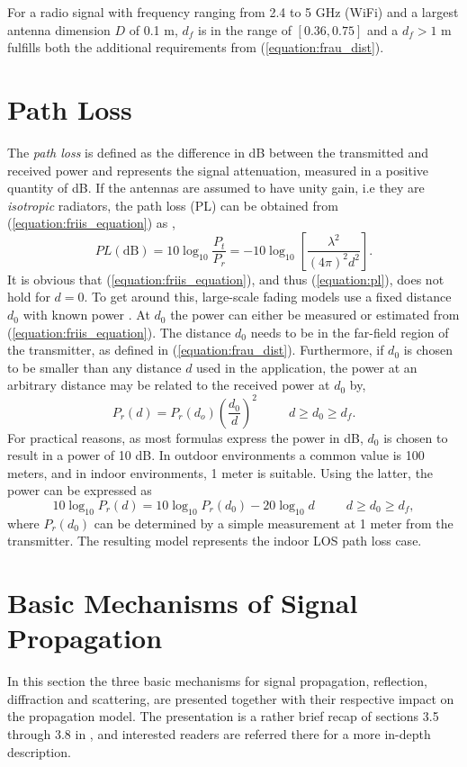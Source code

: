 \documentclass{LTHthesis}
\begin{document}
For a radio signal with frequency ranging from 2.4 to 5 GHz (WiFi) and a largest antenna dimension $D$ of 0.1 m, $d_f$ is in the
range of $\left[0.36,0.75\right]$  and a $d_f>1$ m fulfills both the additional requirements from (\ref{equation:frau_dist}).
%
\section{Path Loss}
%
The \emph{path loss} is defined as the difference in dB between the transmitted and received power and represents the signal attenuation, measured in a positive quantity of dB. If the antennas are assumed to have unity gain, i.e they are \emph{isotropic} radiators, the path loss (PL) can be obtained from (\ref{equation:friis_equation}) as \cite{rappaport96}, 
%
\begin{equation}
PL\left(\text{dB}\right)=10\log_{10}{\frac{P_t}{P_r}}=-10\log_{10}{\left[\frac{\lambda^2}{\left(4\pi\right)^2d^2}\right]}\label{equation:pl}.
\end{equation} 
%
It is obvious that (\ref{equation:friis_equation}), and thus (\ref{equation:pl}), does not hold for $d=0$. To get around this, large-scale fading models use a fixed distance $d_0$ with known power \cite{rappaport96}. At $d_0$ the power can either be measured or estimated from (\ref{equation:friis_equation}). The distance $d_0$ needs to be in the far-field region of the transmitter, as defined in (\ref{equation:frau_dist}). Furthermore, if $d_0$ is chosen to be smaller than any distance $d$ used in the application, the power at an arbitrary distance may be related to the received power at $d_0$ by,
%
\begin{equation}
P_r(d)=P_r(d_o)\left(\frac{d_0}{d}\right)^2 \hspace{30pt} d\geq d_0\geq d_f.
\end{equation}
%
For practical reasons, as most formulas express the power in dB, $d_0$ is chosen to result in a power of 10 dB. In outdoor environments a common value is 100 meters, and in indoor environments, 1 meter is suitable. Using the latter, the power can be expressed as
%
\begin{equation}
10\log_{10}{P_r(d)}=10\log_{10}{P_r(d_0)}-20\log_{10}{d} \hspace{30pt} d\geq d_0\geq d_f,
\end{equation}   
%
where $P_r(d_0)$ can be determined by a simple measurement at 1 meter from the transmitter. The resulting model represents the indoor LOS path loss case.
%
\section{Basic Mechanisms of Signal Propagation}
%
In this section the three basic mechanisms for signal propagation, reflection, diffraction and scattering, are presented together with their respective impact on the propagation model. The presentation is a rather brief recap of sections 3.5 through 3.8 in  \cite{rappaport96}, and interested readers are referred there for a more in-depth description.  
%
\end{document}
